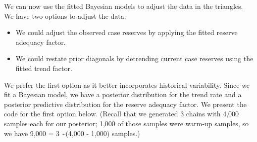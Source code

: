 \documentclass[
  letterpaper,
  DIV=11,
  numbers=noendperiod]{scrartcl}
\begin{document}
We can now use the fitted Bayesian models to adjust the data in the
triangles. We have two options to adjust the data:

\begin{itemize}
\item
  We could adjust the observed case reserves by applying the fitted
  reserve adequacy factor.
\item
  We could restate prior diagonals by detrending current case reserves
  using the fitted trend factor.
\end{itemize}

We prefer the first option as it better incorporates historical
variability. Since we fit a Bayesian model, we have a posterior
distribution for the trend rate and a posterior predictive distribution
for the reserve adequacy factor. We present the code for the first
option below. (Recall that we generated 3 chains with 4,000 samples each
for our posterior; 1,000 of those samples were warm-up samples, so we
have 9,000 = 3 \times\textasciitilde(4,000 - 1,000) samples.)
\end{document}
